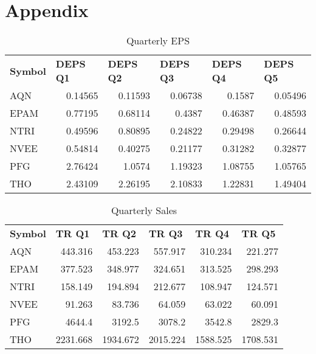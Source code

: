 \documentclass{article}
\begin{document}
\section{Appendix}
\begin{table}[htbp]
  \caption{Quarterly EPS}
   \begin{tabular}{lrrrrr}
   	\textbf{Symbol} & \multicolumn{1}{l}{\textbf{DEPS Q1}} & \multicolumn{1}{l}{\textbf{DEPS Q2}} & \multicolumn{1}{l}{\textbf{DEPS Q3}} & \multicolumn{1}{l}{\textbf{DEPS Q4}} & \multicolumn{1}{l}{\textbf{DEPS Q5}} \\
   	AQN   & 0.14565 & 0.11593 & 0.06738 & 0.1587 & 0.05496 \\
   	EPAM  & 0.77195 & 0.68114 & 0.4387 & 0.46387 & 0.48593 \\
   	NTRI  & 0.49596 & 0.80895 & 0.24822 & 0.29498 & 0.26644 \\
   	NVEE  & 0.54814 & 0.40275 & 0.21177 & 0.31282 & 0.32877 \\
   	PFG   & 2.76424 & 1.0574 & 1.19323 & 1.08755 & 1.05765 \\
   	THO   & 2.43109 & 2.26195 & 2.10833 & 1.22831 & 1.49404 \\
   \end{tabular}%
   \label{tab:addlabel}%
\end{table}%

\begin{table}[htbp]
  \caption{Quarterly Sales}
    \begin{tabular}{lrrrrr}
    	\textbf{Symbol} & \multicolumn{1}{l}{\textbf{TR Q1}} & \multicolumn{1}{l}{\textbf{TR Q2}} & \multicolumn{1}{l}{\textbf{TR Q3}} & \multicolumn{1}{l}{\textbf{TR Q4}} & \multicolumn{1}{l}{\textbf{TR Q5}} \\
    	AQN   & 443.316 & 453.223 & 557.917 & 310.234 & 221.277 \\
    	EPAM  & 377.523 & 348.977 & 324.651 & 313.525 & 298.293 \\
    	NTRI  & 158.149 & 194.894 & 212.677 & 108.947 & 124.571 \\
    	NVEE  & 91.263 & 83.736 & 64.059 & 63.022 & 60.091 \\
    	PFG   & 4644.4 & 3192.5 & 3078.2 & 3542.8 & 2829.3 \\
    	THO   & 2231.668 & 1934.672 & 2015.224 & 1588.525 & 1708.531 \\
    \end{tabular}%
    \label{tab:addlabel}%
\end{table}%
\end{document}
